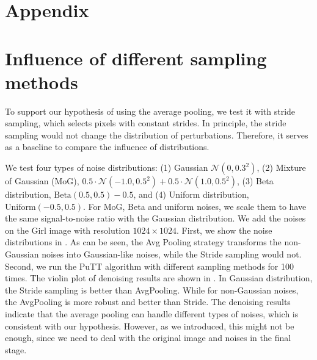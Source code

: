 \clearpage
\onecolumn
\section*{Appendix}

\section{Influence of different sampling methods}
\label{app:avgpool}
To support our hypothesis of using the average pooling, we test it with stride sampling, which selects pixels with constant strides.
In principle, the stride sampling would not change the distribution of perturbations. Therefore, it serves as a baseline to compare the influence of distributions.

We test four types of noise distributions: (1) Gaussian $\mathcal{N}(0, 0.3^2)$, (2) Mixture of Gaussian (MoG), $0.5\cdot\mathcal{N}(-1.0, 0.5^2) + 0.5\cdot\mathcal{N}(1.0, 0.5^2)$, (3) Beta distribution, $\text{Beta}(0.5, 0.5) - 0.5$, and (4) Uniform distribution, $\text{Uniform}(-0.5, 0.5)$. For MoG, Beta and uniform noises, we scale them to have the same signal-to-noise ratio with the Gaussian distribution. We add the noises on the Girl image \cite{loeschcke2024coarse} with resolution $1024 \times 1024$. First, we show the noise distributions in . As can be seen, the Avg Pooling strategy transforms the non-Gaussian noises into Gaussian-like noises, while the Stride sampling would not. Second, we run the PuTT algorithm with different sampling methods for 100 times. The violin plot of denoising results are shown in .
In Gaussian distribution, the Stride sampling is better than AvgPooling. While for non-Gaussian noises, the AvgPooling is more robust and better than Stride.
The denoising results indicate that the average pooling can handle different types of noises, which is consistent with our hypothesis. However, as we introduced, this might not be enough, since we need to deal with the original image and noises in the final stage.

